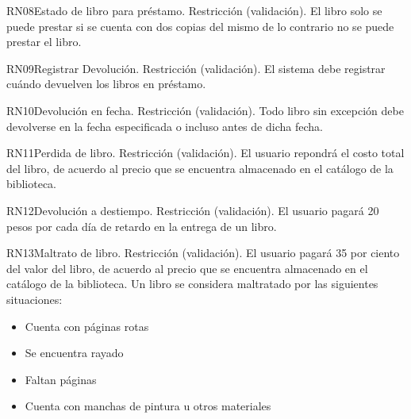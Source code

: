\begin{BussinesRule}{RN08}{Estado de libro para préstamo.} 
	\BRitem[Tipo:] Restricción (validación).
	\BRitem[Descripción:]El libro solo se puede prestar si se cuenta con dos copias del mismo de lo contrario no se puede prestar el libro.
\end{BussinesRule}

\begin{BussinesRule}{RN09}{Registrar Devolución.} 
	\BRitem[Tipo:] Restricción (validación).
	\BRitem[Descripción:]El sistema debe registrar cuándo devuelven los libros en préstamo.
\end{BussinesRule}

\begin{BussinesRule}{RN10}{Devolución en fecha.} 
	\BRitem[Tipo:] Restricción (validación).
	\BRitem[Descripción:]Todo libro sin excepción debe devolverse en la fecha especificada o incluso antes de dicha fecha.
\end{BussinesRule}

\begin{BussinesRule}{RN11}{Perdida de libro.} 
	\BRitem[Tipo:] Restricción (validación).
	\BRitem[Descripción:]El usuario repondrá el costo total del libro, de acuerdo al precio que se encuentra almacenado en el catálogo de la biblioteca.
\end{BussinesRule}

\begin{BussinesRule}{RN12}{Devolución a destiempo.} 
	\BRitem[Tipo:] Restricción (validación).
	\BRitem[Descripción:]El usuario pagará 20 pesos por cada día de retardo en la entrega de un libro.
\end{BussinesRule}

\begin{BussinesRule}{RN13}{Maltrato de libro.} 
	\BRitem[Tipo:] Restricción (validación).
	\BRitem[Descripción:]El usuario pagará 35 por ciento del valor del libro, de acuerdo al precio que se encuentra almacenado en el catálogo de la biblioteca. Un libro se considera maltratado por las siguientes situaciones:
	\begin{itemize}
	\item Cuenta con páginas rotas
	\item Se encuentra rayado
	\item Faltan páginas
	\item Cuenta con manchas de pintura u otros materiales

	\end{itemize}
\end{BussinesRule}

